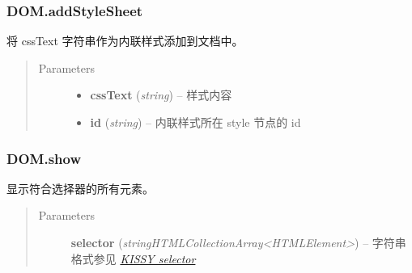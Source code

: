 \documentclass[letterpaper,10pt,english]{sphinxmanual}
\begin{document}
\subsubsection{DOM.addStyleSheet}
\label{api/core/dom/addStyleSheet:dom-addstylesheet}\label{api/core/dom/addStyleSheet::doc}

\begin{fulllineitems}
\label{api/core/dom/addStyleSheet:DOM.addStyleSheet}
将 cssText 字符串作为内联样式添加到文档中。
\begin{quote}\begin{description}
\item[{Parameters}] \leavevmode\begin{itemize}
\item {}
\textbf{cssText} (\emph{string}) -- 样式内容

\item {}
\textbf{id} (\emph{string}) -- 内联样式所在 style 节点的 id

\end{itemize}

\end{description}\end{quote}

\end{fulllineitems}



\subsubsection{DOM.show}
\label{api/core/dom/show:dom-show}\label{api/core/dom/show::doc}

\begin{fulllineitems}
\label{api/core/dom/show:DOM.show}
显示符合选择器的所有元素。
\begin{quote}\begin{description}
\item[{Parameters}] \leavevmode
\textbf{selector} (\emph{string\textbar{}HTMLCollection\textbar{}Array\textless{}HTMLElement\textgreater{}}) -- 字符串格式参见 {\hyperref[api/core/dom/selector:dom-selector]{\emph{KISSY selector}}}

\end{description}\end{quote}

\end{fulllineitems}
\end{document}
